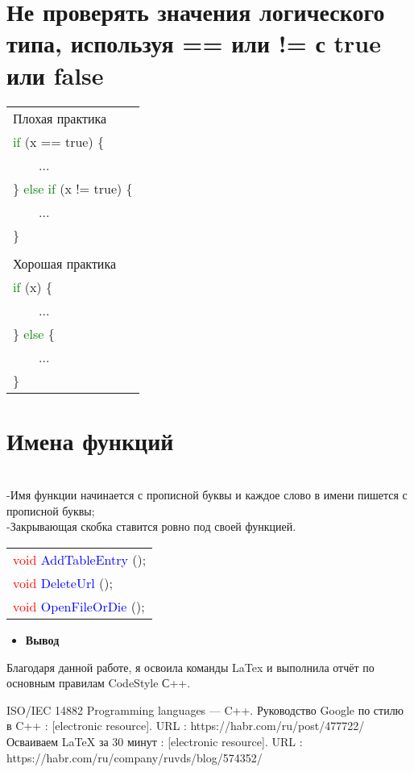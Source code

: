 \documentclass[12pt, letterpaper]{article}
\begin{document}
\section{Не проверять значения логического типа, используя == или != с true или false}
\begin{flushleft}
\begin{tabular}{ |l| } 
\hline
Плохая практика\\
\textcolor{green}{if }(x == true) \{\\
\ \ \ \ ...\\
\} \textcolor{green}{else if }(x != true) \{\\
\ \ \ \ ...\\
\}\\
\\
Хорошая практика\\
\textcolor{green}{if }(x) \{\\
\ \ \ \ ...\\
\} \textcolor{green}{else }\{\\
\ \ \ \ ...\\
\}\\
\hline
\end{tabular}
\end{flushleft}

\section{Имена функций}
\\-Имя функции начинается с прописной буквы и каждое слово в имени пишется с прописной буквы;
\\-Закрывающая скобка ставится ровно под своей функцией.
\begin{flushleft}
\begin{tabular}{ |l| } 
\hline
\textcolor{red}{void} \textcolor{blue}{AddTableEntry} ();\\
\textcolor{red}{void} \textcolor{blue}{DeleteUrl} ();\\
\textcolor{red}{void} \textcolor{blue}{OpenFileOrDie} ();\\
\hline
\end{tabular}
\end{flushleft}
\begin{itemize}
\item\Large\textbf{Вывод}
\end{itemize}
Благодаря данной работе, я освоила команды LaTex и выполнила отчёт по основным правилам CodeStyle С++. 
\begin{thebibliography}{3}
ISO/IEC 14882 Programming languages — C++.
Руководство Google по стилю в C++ : [electronic resource].
URL : https://habr.com/ru/post/477722/
Осваиваем LaTeX за 30 минут : [electronic resource].
URL : https://habr.com/ru/company/ruvds/blog/574352/
\end{thebibliography}
\end{document}
